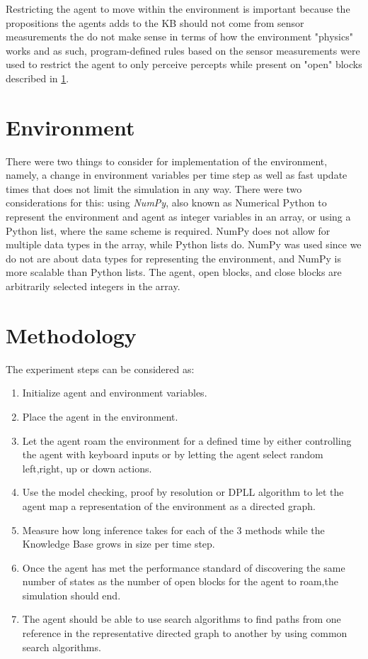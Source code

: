 Restricting the agent to move within the environment is important because the propositions the agents adds to the KB should not come from sensor measurements the do not make sense in terms of how the environment "physics" works and as such, program-defined rules based on the sensor measurements were used to restrict the agent to only perceive percepts while present on "open" blocks described in \ref{sec:environment}.




\section{Environment}
\label{sec:environment}

There were two things to consider for implementation of the environment, namely, a change in environment variables per time step as well as fast update times that does not limit the simulation in any way. There were two considerations for this: using \textit{NumPy}, also known as Numerical Python to represent the environment and agent as integer variables in an array, or using a Python list, where the same scheme is required. NumPy does not allow for multiple data types in the array, while Python lists do. NumPy was used since we do not are about data types for representing the environment, and NumPy is more scalable than Python lists. The agent, open blocks, and close blocks are arbitrarily selected integers in the array.
\section{Methodology}
\label{sec:experimental_method}

The experiment steps can be considered as:

\begin{enumerate}
	\item Initialize agent and environment variables.
	\item Place the agent in the environment.
	\item Let the agent roam the environment for a defined time by either controlling the agent with keyboard inputs or by letting the agent select random left,right, up or down actions.
	\item Use the model checking, proof by resolution or DPLL algorithm to let the agent map a representation of the environment as a directed graph.
	\item Measure how long inference takes for each of the 3 methods while the Knowledge Base grows in size per time step.
	\item Once the agent has met the performance standard of discovering the same number of states as the number of open blocks for the agent to roam,the simulation should end.
	\item The agent should be able to use search algorithms to find paths from one reference in the representative directed graph to another by using common search algorithms.
\end{enumerate}

